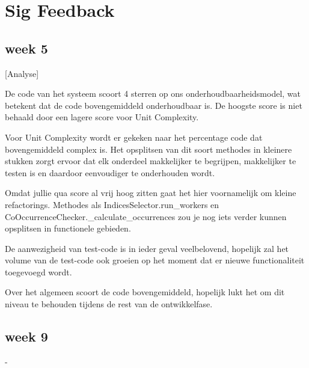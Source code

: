 \chapter{Sig Feedback}\label{sig_fb}
\section{week 5}
[Analyse]

De code van het systeem scoort 4 sterren op ons onderhoudbaarheidsmodel, wat betekent dat de code bovengemiddeld onderhoudbaar is. De hoogste score is niet behaald door een lagere score voor Unit Complexity.

Voor Unit Complexity wordt er gekeken naar het percentage code dat bovengemiddeld complex is. Het opsplitsen van dit soort methodes in kleinere stukken zorgt ervoor dat elk onderdeel makkelijker te begrijpen, makkelijker te testen is en daardoor eenvoudiger te onderhouden wordt.

Omdat jullie qua score al vrij hoog zitten gaat het hier voornamelijk om kleine refactorings. Methodes als IndicesSelector.run\_workers en CoOccurrenceChecker.\_calculate\_occurrences zou je nog iets verder kunnen opsplitsen in functionele gebieden.

De aanwezigheid van test-code is in ieder geval veelbelovend, hopelijk zal het volume van de test-code ook groeien op het moment dat er nieuwe functionaliteit toegevoegd wordt.

Over het algemeen scoort de code bovengemiddeld, hopelijk lukt het om dit niveau te behouden tijdens de rest van de ontwikkelfase.

\section{week 9}
-